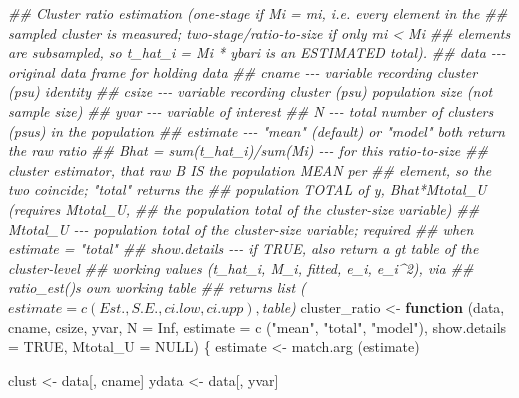 \documentclass[
  letterpaper,
  DIV=11,
  numbers=noendperiod]{scrreprt}
\newenvironment{Shaded}{\begin{snugshade}}{\end{snugshade}}
\newcommand{\AttributeTok}[1]{\textcolor[rgb]{0.40,0.45,0.13}{#1}}
\newcommand{\ConstantTok}[1]{\textcolor[rgb]{0.56,0.35,0.01}{#1}}
\newcommand{\ControlFlowTok}[1]{\textcolor[rgb]{0.00,0.23,0.31}{\textbf{#1}}}
\newcommand{\DocumentationTok}[1]{\textcolor[rgb]{0.37,0.37,0.37}{\textit{#1}}}
\newcommand{\FunctionTok}[1]{\textcolor[rgb]{0.28,0.35,0.67}{#1}}
\newcommand{\NormalTok}[1]{\textcolor[rgb]{0.00,0.23,0.31}{#1}}
\newcommand{\OtherTok}[1]{\textcolor[rgb]{0.00,0.23,0.31}{#1}}
\newcommand{\StringTok}[1]{\textcolor[rgb]{0.13,0.47,0.30}{#1}}
\renewcommand{\[}{\begin{equation}}
\renewcommand{\]}{\end{equation}}
\begin{document}
\begin{Shaded}
\begin{Highlighting}[]
\DocumentationTok{\#\# Cluster ratio estimation (one{-}stage if Mi = mi, i.e. every element in the}
\DocumentationTok{\#\# sampled cluster is measured; two{-}stage/ratio{-}to{-}size if only mi \textless{} Mi}
\DocumentationTok{\#\# elements are subsampled, so t\_hat\_i = Mi * ybari is an ESTIMATED total).}
\DocumentationTok{\#\# data {-}{-}{-} original data frame for holding data}
\DocumentationTok{\#\# cname {-}{-}{-} variable recording cluster (psu) identity}
\DocumentationTok{\#\# csize {-}{-}{-} variable recording cluster (psu) population size (not sample size)}
\DocumentationTok{\#\# yvar {-}{-}{-} variable of interest}
\DocumentationTok{\#\# N {-}{-}{-} total number of clusters (psus) in the population}
\DocumentationTok{\#\# estimate {-}{-}{-} "mean" (default) or "model" both return the raw ratio}
\DocumentationTok{\#\#              Bhat = sum(t\_hat\_i)/sum(Mi) {-}{-}{-} for this ratio{-}to{-}size}
\DocumentationTok{\#\#              cluster estimator, that raw B IS the population MEAN per}
\DocumentationTok{\#\#              element, so the two coincide; "total" returns the}
\DocumentationTok{\#\#              population TOTAL of y, Bhat*Mtotal\_U (requires Mtotal\_U,}
\DocumentationTok{\#\#              the population total of the cluster{-}size variable)}
\DocumentationTok{\#\# Mtotal\_U {-}{-}{-} population total of the cluster{-}size variable; required}
\DocumentationTok{\#\#              when estimate = "total"}
\DocumentationTok{\#\# show.details {-}{-}{-} if TRUE, also return a gt table of the cluster{-}level}
\DocumentationTok{\#\#                  working values (t\_hat\_i, M\_i, fitted, e\_i, e\_i\^{}2), via}
\DocumentationTok{\#\#                  ratio\_est()\textquotesingle{}s own working table}
\DocumentationTok{\#\# returns list ($estimate = c(Est., S.E., ci.low, ci.upp), $table)}
\NormalTok{cluster\_ratio }\OtherTok{\textless{}{-}} \ControlFlowTok{function}\NormalTok{ (data, cname, csize, yvar, }\AttributeTok{N =} \ConstantTok{Inf}\NormalTok{,}
                            \AttributeTok{estimate =} \FunctionTok{c}\NormalTok{ (}\StringTok{"mean"}\NormalTok{, }\StringTok{"total"}\NormalTok{, }\StringTok{"model"}\NormalTok{),}
                            \AttributeTok{show.details =} \ConstantTok{TRUE}\NormalTok{, }\AttributeTok{Mtotal\_U =} \ConstantTok{NULL}\NormalTok{)}
\NormalTok{\{}
\NormalTok{  estimate }\OtherTok{\textless{}{-}} \FunctionTok{match.arg}\NormalTok{ (estimate)}

\NormalTok{  clust }\OtherTok{\textless{}{-}}\NormalTok{ data[, cname]}
\NormalTok{  ydata }\OtherTok{\textless{}{-}}\NormalTok{ data[, yvar]}


\end{Highlighting}
\end{Shaded}
\end{document}
